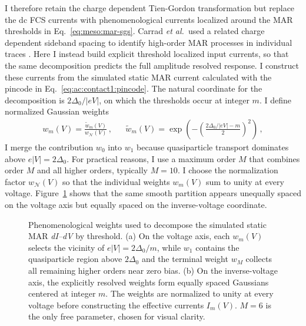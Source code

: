         I therefore retain the charge dependent Tien-Gordon transformation but replace the dc FCS currents with phenomenological currents localized around the MAR thresholds in Eq.~\eqref{eq:meso:mar-sgs}. Carrad \textit{et al.}~used a related charge dependent sideband spacing to identify high-order MAR processes in individual traces \cite{carrad_photon-assisted_2022}. Here I instead build explicit threshold localized input currents, so that the same decomposition predicts the full amplitude resolved response. I construct these currents from the simulated static MAR current calculated with the pincode in Eq.~\eqref{eq:ac:contact1:pincode}. The natural coordinate for the decomposition is $2\Delta_0/|eV|$, on which the thresholds occur at integer $m$. I define normalized Gaussian weights
        \begin{align}
            w_m(V) = \frac{\tilde{w}_m(V)}{w_\mathcal{N}(V)}\,, &&
            \tilde{w}_m(V)=\exp\!\left(-\left(\frac{2\Delta_0/|eV|-m}{2}\right)^2\right)\,,
            \label{eq:ac:pamar:weights}
        \end{align}
        I merge the contribution $w_0$ into $w_1$ because quasiparticle transport dominates above $e|V|=2\Delta_0$. For practical reasons, I use a maximum order $M$ that combines order $M$ and all higher orders, typically $M=10$. I choose the normalization factor $w_\mathcal{N}(V)$ so that the individual weights $w_m(V)$ sum to unity at every voltage. Figure~\ref{fig:ac:pamar-weights} shows that the same smooth partition appears unequally spaced on the voltage axis but equally spaced on the inverse-voltage coordinate.

        \begin{figure}[t]
            \centering
            \hfill
            \caption{
                Phenomenological weights used to decompose the simulated static MAR \textit{dI--dV} by threshold. (a) On the voltage axis, each $w_m(V)$ selects the vicinity of $e|V|=2\Delta_0/m$, while $w_1$ contains the quasiparticle region above $2\Delta_0$ and the terminal weight $w_M$ collects all remaining higher orders near zero bias. (b) On the inverse-voltage axis, the explicitly resolved weights form equally spaced Gaussians centered at integer $m$. The weights are normalized to unity at every voltage before constructing the effective currents $I_m(V)$. $M=6$ is the only free parameter, chosen for visual clarity.
            }
            \label{fig:ac:pamar-weights}
        \end{figure}

